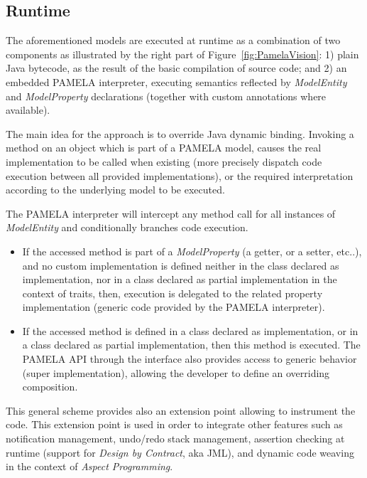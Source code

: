  \subsection{Runtime}
 \label{sub:RunTime}
 
 The aforementioned models are executed at runtime as a combination of two components as illustrated by  the right part of Figure~\ref{fig:PamelaVision}: 1) plain Java bytecode, as the result of the basic compilation of source code; and 2) an embedded PAMELA interpreter, executing semantics reflected by \emph{ModelEntity} and \emph{ModelProperty}  declarations (together with custom annotations where available).

The main idea for the approach is to override Java dynamic binding. Invoking a method on an object which is part of a PAMELA model, causes the real implementation to be called when existing (more precisely dispatch code execution between all provided implementations), or the required interpretation according to the underlying model to be executed. 
 
The PAMELA interpreter will intercept any method call for all instances of \emph{ModelEntity} and conditionally branches code execution.
 \begin{itemize}
     \item If the accessed method is part of a \emph{ModelProperty} (a getter, or a setter, etc..), and no custom implementation is defined neither in the class declared as implementation, nor in a class declared as partial implementation in the context of traits, then, execution is delegated to the related property implementation (generic code provided by the PAMELA interpreter).
     \item If the accessed method is defined in a class declared as implementation, or in a class declared as partial implementation, then this method is executed. The PAMELA API through the  interface also provides access to generic behavior (super implementation), allowing the developer to define an overriding composition.
 \end{itemize}
 
This general scheme provides also an extension point allowing to instrument the code. This extension point is used in order to integrate other features such as notification management, undo/redo stack management, assertion checking at runtime (support for \emph{Design by Contract}, aka JML), and dynamic code weaving in the context of \emph{Aspect Programming}.

